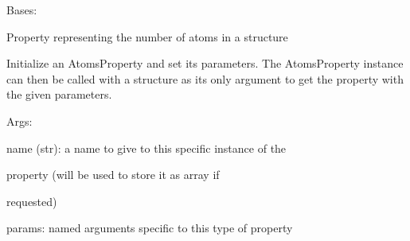 \documentclass[letterpaper,10pt,english]{sphinxmanual}
\begin{document}
\begin{fulllineitems}
\label{doctree/soprano.properties.basic.basic:soprano.properties.basic.basic.NumAtoms}
Bases: {\hyperref[doctree/soprano.properties.atomsproperty:soprano.properties.atomsproperty.AtomsProperty]{}}

Property representing the number of atoms in a structure

Initialize an AtomsProperty and set its parameters.
The AtomsProperty instance can then be called with a structure as its
only argument to get the property with the given parameters.

\begin{DUlineblock}{0em}
\item[] Args:
\item[]
\begin{DUlineblock}{\DUlineblockindent}
\item[] name (str): a name to give to this specific instance of the
\item[]
\begin{DUlineblock}{\DUlineblockindent}
\item[] property (will be used to store it as array if
\item[] requested)
\end{DUlineblock}
\item[] params: named arguments specific to this type of property
\end{DUlineblock}
\end{DUlineblock}

\begin{fulllineitems}
\label{doctree/soprano.properties.basic.basic:soprano.properties.basic.basic.NumAtoms.default_name}
\end{fulllineitems}


\begin{fulllineitems}
\label{doctree/soprano.properties.basic.basic:soprano.properties.basic.basic.NumAtoms.default_params}
\end{fulllineitems}


\begin{fulllineitems}
\label{doctree/soprano.properties.basic.basic:soprano.properties.basic.basic.NumAtoms.extract}
\end{fulllineitems}


\end{fulllineitems}
\end{document}
